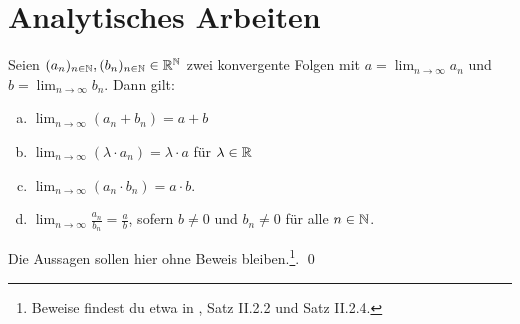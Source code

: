 \section{Analytisches Arbeiten}


\begin{satz} \label{konvergenzregeln}
    Seien $(a_n)_{n\in \mathbb N},(b_n)_{n\in \mathbb N}\in \mathbb R^\mathbb N$ zwei konvergente Folgen mit $a=\lim_{n\to\infty}a_n$ und $b=\lim_{n\to\infty}b_n$. Dann gilt:
    \begin{enumerate}[a)]
        \item $\lim_{n\to\infty}(a_n+b_n)=a+b$
        \item $\lim_{n\to\infty}(\lambda \cdot a_n)=\lambda \cdot a$ für $\lambda\in\mathbb R$
        \item $\lim_{n\to\infty}(a_n\cdot b_n)=a\cdot b$.
        \item $\lim_{n\to\infty}\frac{a_n}{b_n} = \frac{a}{b}$, sofern $b\neq 0$ und $b_n\neq 0$ für alle $n\in \mathbb N$.
    \end{enumerate}
\end{satz}


\begin{bew}
    Die Aussagen sollen hier ohne Beweis bleiben.\footnote{Beweise findest du etwa in \cite{AE06}, Satz II.2.2 und Satz II.2.4.}. \qed
\end{bew}


